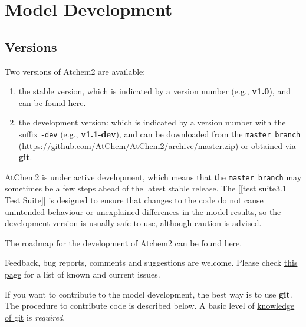 \chapter{Model Development} \label{ch:development}

\section{Versions} \label{sec:versions}

Two versions of Atchem2 are available:

\begin{enumerate}
\item the stable version, which is indicated by a version number
(e.g., \textbf{v1.0}), and can be found
\href{https://github.com/AtChem/AtChem2/releases}{here}.
\item the development version: which is indicated by a version number
with the suffix \texttt{-dev} (e.g., \textbf{v1.1-dev}), and can be
downloaded from the \texttt{master\ branch}
(https://github.com/AtChem/AtChem2/archive/master.zip) or obtained via
\textbf{git}.
\end{enumerate}

AtChem2 is under active development, which means that the
\texttt{master\ branch} may sometimes be a few steps ahead of the
latest stable release. The {[}{[}test suite\textbar{}3.1 Test
Suite{]}{]} is designed to ensure that changes to the code do not
cause unintended behaviour or unexplained differences in the model
results, so the development version is usually safe to use, although
caution is advised.

The roadmap for the development of Atchem2 can be found
\href{https://github.com/AtChem/AtChem2/projects/1}{here}.

Feedback, bug reports, comments and suggestions are welcome. Please
check \href{https://github.com/AtChem/AtChem2/issues}{this page} for a
list of known and current issues.

If you want to contribute to the model development, the best way is to
use \textbf{git}. The procedure to contribute code is described
below. A basic level of
\href{https://swcarpentry.github.io/git-novice/}{knowledge of git} is
\emph{required}.


